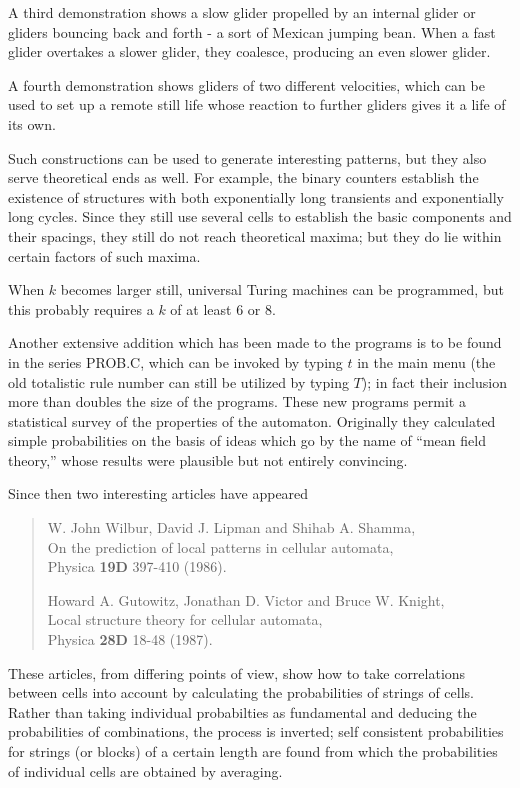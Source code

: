 A third demonstration shows a slow glider propelled by an internal 
glider or gliders bouncing back and forth - a sort of Mexican jumping 
bean. When a fast glider overtakes a slower glider, they coalesce, 
producing an even slower glider. 

A fourth demonstration shows gliders of two different velocities, which
can be used to set up a remote still life whose reaction to further 
gliders gives it a life of its own. 

Such constructions can be used to generate interesting patterns, but 
they also serve theoretical ends as well. For example, the binary 
counters establish the existence of structures with both exponentially 
long transients and exponentially long cycles. Since they still use 
several cells to establish the basic components and their spacings, 
they still do not reach theoretical maxima; but they do lie within 
certain factors of such maxima.

When $k$ becomes larger still, universal Turing machines can be 
programmed, but this probably requires a $k$ of at least 6 or 8.

Another extensive addition which has been made to the programs is to be 
found in the series PROB.C, which can be invoked by typing $t$ in the 
main menu (the old totalistic rule number can still be utilized by 
typing $T$); in fact their inclusion more than doubles the size of the 
programs. These new programs permit a statistical survey of the 
properties of the automaton. Originally they calculated simple 
probabilities on the basis of ideas which go by the name of ``mean field 
theory,'' whose results were plausible but not entirely convincing.

Since then two interesting articles have appeared 

\begin{quote} 
\noindent
	W. John Wilbur, David J. Lipman and Shihab A. Shamma, \\
	On the 	prediction of local patterns in cellular automata, \\
	Physica {\bf 19D} 397-410 (1986).

\noindent
	Howard A. Gutowitz, Jonathan D. Victor and Bruce W. Knight, \\
	Local structure theory for cellular automata, \\
	Physica {\bf 28D} 18-48 (1987). 
\end{quote} 

These articles, from differing points of view, show how to take 
correlations between cells into account by calculating the 
probabilities of strings of cells. Rather than taking individual 
probabilties as fundamental and deducing the probabilities of 
combinations, the process is inverted; self consistent probabilities 
for strings (or blocks) of a certain length are found from which the 
probabilities of individual cells are obtained by averaging.

